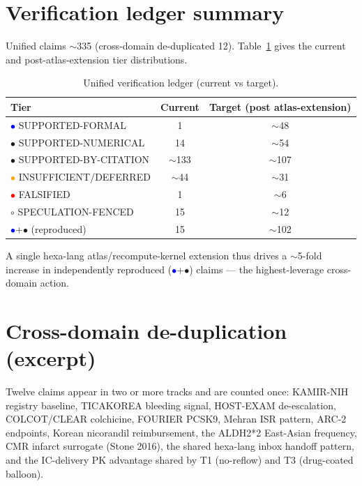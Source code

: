 \documentclass[11pt]{article}
\begin{document}
\appendix
\section{Verification ledger summary}
\label{app:ledger}
Unified claims $\sim$335 (cross-domain de-duplicated 12). Table~\ref{tab:ledger} gives the current and post-atlas-extension tier distributions.

\begin{table}[h]
\centering
\caption{Unified verification ledger (current vs target).}
\label{tab:ledger}
\begin{tabular}{lcc}
\toprule
Tier & Current & Target (post atlas-extension) \\
\midrule
\textcolor{blue}{$\bullet$} SUPPORTED-FORMAL      & 1     & $\sim$48 \\
\textcolor{green!60!black}{$\bullet$} SUPPORTED-NUMERICAL & 14    & $\sim$54 \\
\textcolor{yellow!70!black}{$\bullet$} SUPPORTED-BY-CITATION & $\sim$133 & $\sim$107 \\
\textcolor{orange}{$\bullet$} INSUFFICIENT/DEFERRED & $\sim$44 & $\sim$31 \\
\textcolor{red}{$\bullet$} FALSIFIED              & 1     & $\sim$6 \\
$\circ$ SPECULATION-FENCED              & 15    & $\sim$12 \\
\midrule
\textcolor{blue}{$\bullet$}+\textcolor{green!60!black}{$\bullet$} (reproduced) & 15 & $\sim$102 \\
\bottomrule
\end{tabular}
\end{table}

\noindent A single hexa-lang atlas/recompute-kernel extension thus drives a $\sim$5-fold increase in independently reproduced (\textcolor{blue}{$\bullet$}+\textcolor{green!60!black}{$\bullet$}) claims --- the highest-leverage cross-domain action.

\section{Cross-domain de-duplication (excerpt)}
\label{app:dedup}
Twelve claims appear in two or more tracks and are counted once: KAMIR-NIH registry baseline, TICAKOREA bleeding signal, HOST-EXAM de-escalation, COLCOT/CLEAR colchicine, FOURIER PCSK9, Mehran ISR pattern, ARC-2 endpoints, Korean nicorandil reimbursement, the ALDH2*2 East-Asian frequency, CMR infarct surrogate (Stone 2016), the shared hexa-lang inbox handoff pattern, and the IC-delivery PK advantage shared by T1 (no-reflow) and T3 (drug-coated balloon).
\end{document}
